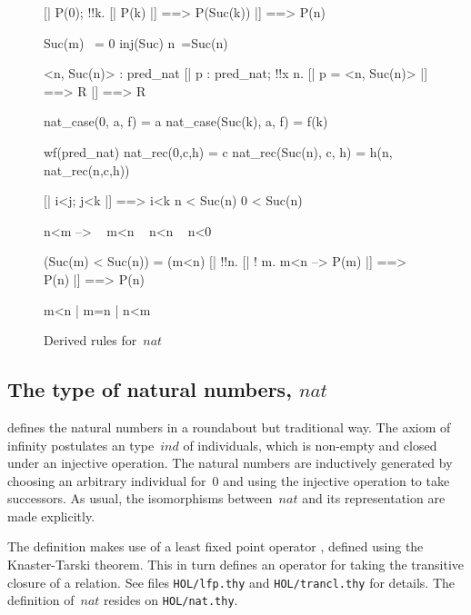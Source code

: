 \begin{figure} \underscoreon
\begin{ttbox}
     [| P(0); !!k. [| P(k) |] ==> P(Suc(k)) |]  ==> P(n)

   Suc(m) ~= 0
        inj(Suc)
    n~=Suc(n)

      <n, Suc(n)> : pred_nat
    [| p : pred_nat;  !!x n. [| p = <n, Suc(n)> |] ==> R |] ==> R

     nat_case(0, a, f) = a
   nat_case(Suc(k), a, f) = f(k)

    wf(pred_nat)
      nat_rec(0,c,h) = c
    nat_rec(Suc(n), c, h) = h(n, nat_rec(n,c,h))

     [| i<j;  j<k |] ==> i<k
          n < Suc(n)
  0 < Suc(n)

   n<m --> ~ m<n 
  ~ n<n
      ~ n<0

    (Suc(m) < Suc(n)) = (m<n)
    [| !!n. [| ! m. m<n --> P(m) |] ==> P(n) |]  ==>  P(n)

    m<n | m=n | n<m
\end{ttbox}
\caption{Derived rules for~$nat$} \label{hol-nat2}
\end{figure}


\subsection{The type of natural numbers, $nat$}
{\HOL} defines the natural numbers in a roundabout but traditional way.
The axiom of infinity postulates an type~$ind$ of individuals, which is
non-empty and closed under an injective operation.  The natural numbers are
inductively generated by choosing an arbitrary individual for~0 and using
the injective operation to take successors.  As usual, the isomorphisms
between~$nat$ and its representation are made explicitly.

The definition makes use of a least fixed point operator ,
defined using the Knaster-Tarski theorem.  This in turn defines an operator
 for taking the transitive closure of a relation.  See
files {\tt HOL/lfp.thy} and {\tt HOL/trancl.thy} for
details.  The definition of~$nat$ resides on {\tt HOL/nat.thy}.  

